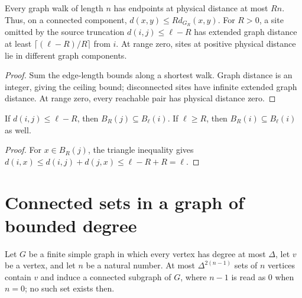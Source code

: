 \begin{lemma}
    \label{thm:hastings05_metric_graph_separation}
    \leanok
    Every graph walk of length $n$ has endpoints at physical distance at
    most $Rn$. Thus, on a connected component,
    $d(x,y)\le R d_{G_R}(x,y)$. For $R>0$, a site omitted by the source
    truncation $d(i,j)\le\ell-R$ has extended graph distance at least
    $\lceil(\ell-R)/R\rceil$ from $i$. At range zero, sites at positive
    physical distance lie in different graph components.
\end{lemma}
\begin{proof}\leanok
    Sum the edge-length bounds along a shortest walk. Graph distance is an
    integer, giving the ceiling bound; disconnected sites have infinite
    extended graph distance. At range zero, every reachable pair has
    physical distance zero.
\end{proof}

\begin{lemma}
    \label{thm:hastings05_metric_retained_support}
    \leanok
    If $d(i,j)\le\ell-R$, then $B_R(j)\subseteq B_\ell(i)$.
    If $\ell\ge R$, then $B_R(i)\subseteq B_\ell(i)$ as well.
\end{lemma}
\begin{proof}\leanok
    For $x\in B_R(j)$, the triangle inequality gives
    $d(i,x)\le d(i,j)+d(j,x)\le\ell-R+R=\ell$.
\end{proof}


\section{Connected sets in a graph of bounded degree}
\label{sec:gaussian_filtered_connected_set_count}

\begin{lemma}
    \label{thm:hastings_connected_set_count_mem}
    \leanok
    Let $G$ be a finite simple graph in which every vertex has degree at most
    $\Delta$, let $v$ be a vertex, and let $n$ be a natural number. At most
    $\Delta^{2(n-1)}$ sets of $n$ vertices contain $v$ and induce a connected
    subgraph of $G$, where $n-1$ is read as $0$ when $n=0$; no such set
    exists then.
\end{lemma}


